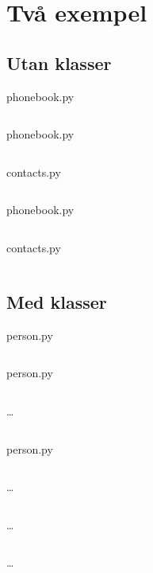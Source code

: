 \mode*

\section{Två exempel}

\subsection{Utan klasser}

\begin{frame}[fragile]
  phonebook.py \hrulefill
  \inputminted[linenos]{python}{examples/phonebook.py}
\end{frame}

\begin{frame}[fragile]
  phonebook.py \hrulefill
  \inputminted[linenos,firstline=5,lastline=6]{python}{examples/phonebook.py}
  \vfill
  contacts.py \hrulefill
  \inputminted[linenos,firstline=5,lastline=16]{python}{examples/contacts.py}
\end{frame}

\begin{frame}[fragile]
  phonebook.py \hrulefill
  \inputminted[linenos,firstline=13,lastline=13]{python}{examples/phonebook.py}
  \vfill
  contacts.py \hrulefill
  \inputminted[linenos,firstline=25,lastline=35]{python}{examples/contacts.py}
\end{frame}

\subsection{Med klasser}

\begin{frame}[fragile]
  person.py \hrulefill
  \inputminted[linenos,lastline=15]{python}{examples/person.py}
\end{frame}

\begin{frame}[fragile]
  person.py \hrulefill
  \inputminted[linenos,firstline=3,lastline=4]{python}{examples/person.py}
  \dots
  \inputminted[autogobble=false,linenos,firstline=17,lastline=23]{python}{examples/person.py}
\end{frame}

\begin{frame}[fragile]
  person.py \hrulefill
  \inputminted[linenos,firstline=3,lastline=5]{python}{examples/person.py}
  \dots
  \inputminted[autogobble=false,linenos,firstline=41,lastline=42]{python}{examples/person.py}
  \dots
  \inputminted[autogobble=false,linenos,firstline=45,lastline=46]{python}{examples/person.py}
  \dots
  \inputminted[linenos,firstline=50,lastline=55]{python}{examples/person.py}
\end{frame}

